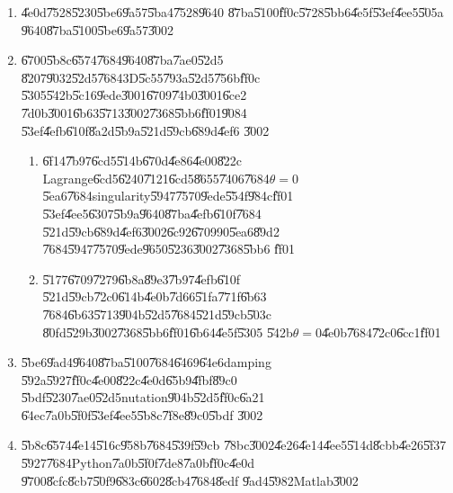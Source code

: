 \begin{enumerate}
\item \U{4e0d}\U{7528}\U{5230}\U{5be6}\U{9a57}\U{5ba4}\U{7528}\U{9640}%
\U{87ba}\U{5100}\U{ff0c}\U{5728}\U{5bb6}\U{4e5f}\U{53ef}\U{4ee5}\U{505a}%
\U{9640}\U{87ba}\U{5100}\U{5be6}\U{9a57}\U{3002}

\item \U{6700}\U{5b8c}\U{6574}\U{7684}\U{9640}\U{87ba}\U{7ae0}\U{52d5}%
\U{8207}\U{9032}\U{52d5}\U{7684}3D\U{5c55}\U{793a}\U{52d5}\U{756b}\U{ff0c}%
\U{5305}\U{542b}\U{5c16}\U{9ede}\U{3001}\U{6709}\U{74b0}\U{3001}\U{6ce2}%
\U{7d0b}\U{3001}\U{6b63}\U{5713}\U{3002}\U{7368}\U{5bb6}\U{ff01}\U{9084}%
\U{53ef}\U{4efb}\U{610f}\U{8a2d}\U{5b9a}\U{521d}\U{59cb}\U{689d}\U{4ef6}%
\U{3002}

\begin{enumerate}
\item \U{6f14}\U{7b97}\U{6cd5}\U{514b}\U{670d}\U{4e86}\U{4e00}\U{822c}%
Lagrange\U{6cd5}\U{6240}\U{7121}\U{6cd5}\U{8655}\U{7406}\U{7684}$\theta =0$%
\U{5ea6}\U{7684}singularity\U{5947}\U{7570}\U{9ede}\U{554f}\U{984c}\U{ff01}%
\U{53ef}\U{4ee5}\U{6307}\U{5b9a}\U{9640}\U{87ba}\U{4efb}\U{610f}\U{7684}%
\U{521d}\U{59cb}\U{689d}\U{4ef6}\U{3002}\U{6c92}\U{6709}90\U{5ea6}\U{89d2}%
\U{7684}\U{5947}\U{7570}\U{9ede}\U{9650}\U{5236}\U{3002}\U{7368}\U{5bb6}%
\U{ff01}

\item \U{5177}\U{6709}\U{7279}\U{6b8a}\U{89e3}\U{7b97}\U{4efb}\U{610f}%
\U{521d}\U{59cb}\U{72c0}\U{614b}\U{4e0b}\U{7d66}\U{51fa}\U{771f}\U{6b63}%
\U{7684}\U{6b63}\U{5713}\U{904b}\U{52d5}\U{7684}\U{521d}\U{59cb}\U{503c}%
\U{80fd}\U{529b}\U{3002}\U{7368}\U{5bb6}\U{ff01}\U{6b64}\U{4e5f}\U{5305}%
\U{542b}$\theta =0$\U{4e0b}\U{7684}\U{72c0}\U{6cc1}\U{ff01}
\end{enumerate}

\item \U{5be6}\U{9ad4}\U{9640}\U{87ba}\U{5100}\U{7684}\U{6469}\U{64e6}damping%
\U{592a}\U{5927}\U{ff0c}\U{4e00}\U{822c}\U{4e0d}\U{65b9}\U{4fbf}\U{89c0}%
\U{5bdf}\U{5230}\U{7ae0}\U{52d5}nutation\U{904b}\U{52d5}\U{ff0c}\U{6a21}%
\U{64ec}\U{7a0b}\U{5f0f}\U{53ef}\U{4ee5}\U{5b8c}\U{7f8e}\U{89c0}\U{5bdf}%
\U{3002}

\item \U{5b8c}\U{6574}\U{4e14}\U{516c}\U{958b}\U{7684}\U{539f}\U{59cb}%
\U{78bc}\U{3002}\U{4e26}\U{4e14}\U{4ee5}\U{514d}\U{8cbb}\U{4e26}\U{5f37}%
\U{5927}\U{7684}Python\U{7a0b}\U{5f0f}\U{7de8}\U{7a0b}\U{ff0c}\U{4e0d}%
\U{9700}\U{8cfc}\U{8cb7}\U{50f9}\U{683c}\U{6602}\U{8cb4}\U{7684}\U{8edf}%
\U{9ad4}\U{5982}Matlab\U{3002}


\end{enumerate}

